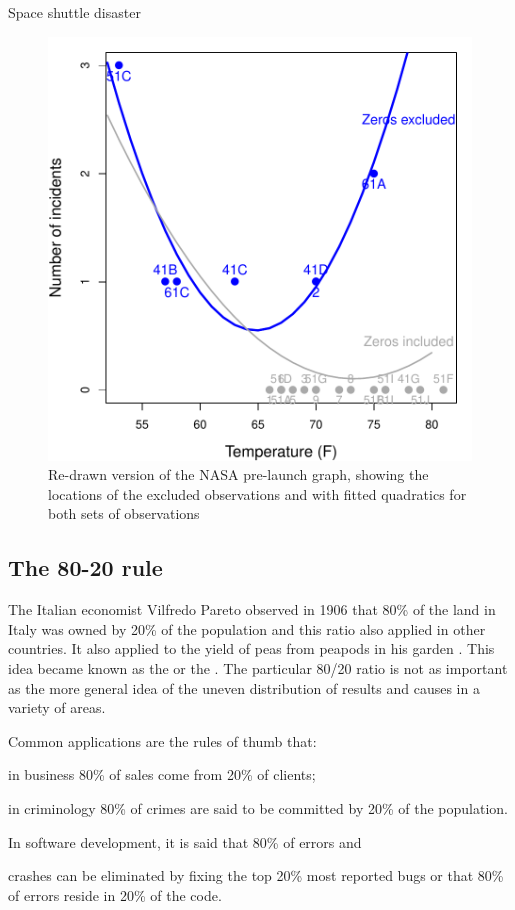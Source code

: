 \documentclass[10pt,krantz2]{krantz}\usepackage[]{graphicx}\usepackage[]{color}
\begin{document}
\begin{Example}[nasa]{Space shuttle disaster}
\begin{figure}[htb]
  \centering
  \includegraphics[width=.7\textwidth,clip]{ch01/fig/nasa}
  \caption{Re-drawn version of the NASA pre-launch graph, showing the locations of the excluded observations and with fitted quadratics for both sets of observations}\label{fig:nasa}
\end{figure}


\end{Example}

\subsection{The 80-20 rule}
The Italian economist Vilfredo Pareto observed in 1906 that 80\% of the land in Italy was
owned by 20\% of the population and this ratio also applied in other countries. 
It also applied to the yield of peas from peapods in his garden \citep{Pareto:1971}.
This idea became known as the
 or the .
The particular 80/20 ratio is not as important as the more general idea of the
uneven distribution of results and causes in a variety of areas.

Common applications are the rules of thumb that: 
\begin{seriate}
  \item in business 80\% of sales come from 20\% of clients; 
  \item in criminology 80\% of crimes are said to be committed by 20\% of the population.
  \item In software development, it is said that 80\% of errors and 
  \item crashes can be eliminated by fixing the top 20\% most reported bugs
or that 80\% of errors reside in 20\% of the code.
\end{seriate}
\end{document}
